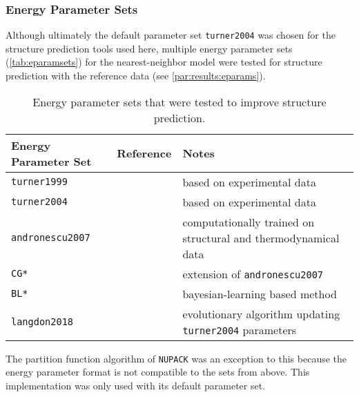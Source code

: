 \documentclass[../../master.tex]{subfiles}
\begin{document}
\subsubsection{Energy Parameter Sets}
\label{ssub:methods:eparams}

Although ultimately the default parameter set \texttt{turner2004} \parencite{turner_nndb_2010} was chosen for the structure prediction tools used here, multiple energy parameter sets (\autoref{tab:eparamsets}) for the nearest-neighbor model were tested for structure prediction with the reference data (see \autoref{par:results:eparams}).

\begin{table}[!ht]
	\centering{}
	\caption[Energy Parameter Sets]{Energy parameter sets that were tested to improve structure prediction.
	}
	\label{tab:eparamsets}
	\begin{tabularx}{1\textwidth}{lrX} \toprule
		\textbf{Energy Parameter Set} & Reference & Notes \\ \midrule
		\texttt{turner1999} & \parencite{turner_nndb_2010} & based on experimental data \\
		\texttt{turner2004} & \parencite{turner_nndb_2010} & based on experimental data \\
		\texttt{andronescu2007} & \parencite{andronescu_efficient_2007} & computationally trained on structural and thermodynamical data \\
		\texttt{CG*} & \parencite{andronescu_computational_2010} & extension of \texttt{andronescu2007}\\
		\texttt{BL*} & \parencite{andronescu_computational_2010} & bayesian-learning based method\\
		\texttt{langdon2018} & \parencite{langdon_evolving_2018} & evolutionary algorithm updating \texttt{turner2004} parameters \\
		\bottomrule
	\end{tabularx}
\end{table}


The partition function algorithm of \texttt{NUPACK} was an exception to this because the energy parameter format is not compatible to the sets from above. 
This implementation was only used with its default parameter set.
\end{document}

